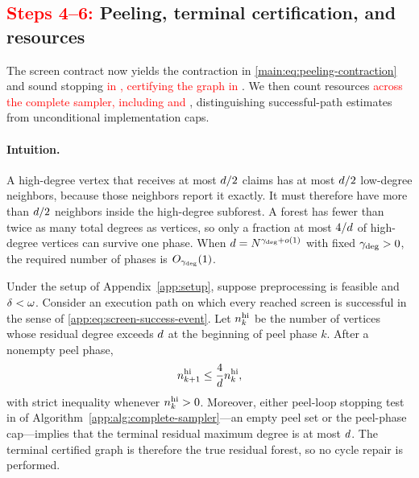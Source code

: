 \subsection{\texorpdfstring{\textcolor{red}{Steps 4--6: }}{Steps 4--6: }Peeling, terminal certification, and resources}
\label{app:upper-proof-structure}

The screen contract now yields the contraction in
\cref{main:eq:peeling-contraction} and sound stopping \textcolor{red}{in
, certifying the graph in }.
We then count resources \textcolor{red}{across the complete sampler, including
 and \AlgoGuardRef}, distinguishing
successful-path estimates from unconditional implementation caps.


\paragraph{Intuition.}
A high-degree vertex that receives at most $d/2$ claims has
at most $d/2$ low-degree neighbors, because those neighbors
report it exactly.  It must therefore have more than $d/2$
neighbors inside the high-degree subforest.  A forest has fewer than
twice as many total degrees as vertices, so only a fraction at most
$4/d$ of high-degree vertices can survive one phase.
When $d=N^{\gamma_{\mathrm{deg}}+o(1)}$ with fixed
$\gamma_{\mathrm{deg}}>0$, the required number of phases is
$O_{\gamma_{\mathrm{deg}}}(1)$.

\begin{lemma}
\label{app:lem:successful-path-structure}
Under the setup of Appendix~\ref{app:setup}, suppose preprocessing is feasible
and $\delta<\omega$.  Consider an execution path on which
every reached screen is successful in the sense of
\eqref{app:eq:screen-success-event}.  Let
$n_{k}^{\mathrm{hi}}$ be the number of vertices whose residual degree exceeds
$d$ at the beginning of peel phase $k$.  After a nonempty peel
phase,
\begin{equation}
 n_{k+1}^{\mathrm{hi}}
 \le\frac{4}{d}n_{k}^{\mathrm{hi}},
 \label{app:eq:proof-peeling-contraction}
\end{equation}
with strict inequality whenever $n_{k}^{\mathrm{hi}}>0$.
Moreover, either peel-loop stopping test in  of
Algorithm~\ref{app:alg:complete-sampler}---an empty peel set or the
peel-phase cap---implies that the terminal residual
maximum degree is at most $d$.  The terminal certified graph is
therefore the true residual forest, so no cycle repair is performed.
\end{lemma}

